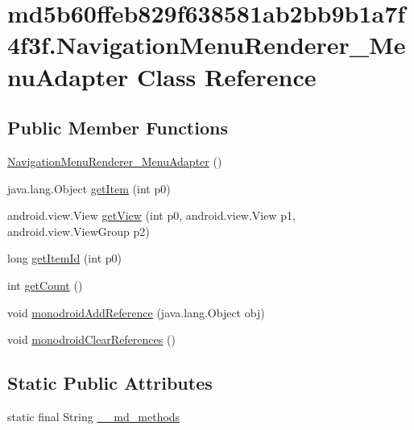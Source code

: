 \hypertarget{classmd5b60ffeb829f638581ab2bb9b1a7f4f3f_1_1_navigation_menu_renderer___menu_adapter}{
\section{md5b60ffeb829f638581ab2bb9b1a7f4f3f.NavigationMenuRenderer\_\-MenuAdapter Class Reference}
\label{classmd5b60ffeb829f638581ab2bb9b1a7f4f3f_1_1_navigation_menu_renderer___menu_adapter}
}
\subsection*{Public Member Functions}
\begin{CompactItemize}
\item 
\hyperlink{classmd5b60ffeb829f638581ab2bb9b1a7f4f3f_1_1_navigation_menu_renderer___menu_adapter_b67bcd1f5861431b9aa745c2ad17fcac}{NavigationMenuRenderer\_\-MenuAdapter} ()
\item 
java.lang.Object \hyperlink{classmd5b60ffeb829f638581ab2bb9b1a7f4f3f_1_1_navigation_menu_renderer___menu_adapter_3cb8fab254be843c50be7d6e6e705d1c}{getItem} (int p0)
\item 
android.view.View \hyperlink{classmd5b60ffeb829f638581ab2bb9b1a7f4f3f_1_1_navigation_menu_renderer___menu_adapter_a621b4dceee4ef8f0c60b60b62206b5a}{getView} (int p0, android.view.View p1, android.view.ViewGroup p2)
\item 
long \hyperlink{classmd5b60ffeb829f638581ab2bb9b1a7f4f3f_1_1_navigation_menu_renderer___menu_adapter_97604532182d2b563da571e93f4470d2}{getItemId} (int p0)
\item 
int \hyperlink{classmd5b60ffeb829f638581ab2bb9b1a7f4f3f_1_1_navigation_menu_renderer___menu_adapter_8d535563c8612033ca9ed9f3f7c61aae}{getCount} ()
\item 
void \hyperlink{classmd5b60ffeb829f638581ab2bb9b1a7f4f3f_1_1_navigation_menu_renderer___menu_adapter_9bf9b83d132d02411f1545779c1151c0}{monodroidAddReference} (java.lang.Object obj)
\item 
void \hyperlink{classmd5b60ffeb829f638581ab2bb9b1a7f4f3f_1_1_navigation_menu_renderer___menu_adapter_94f3e1fc8dc319bcb897648b1c681949}{monodroidClearReferences} ()
\end{CompactItemize}
\subsection*{Static Public Attributes}
\begin{CompactItemize}
\item 
static final String \hyperlink{classmd5b60ffeb829f638581ab2bb9b1a7f4f3f_1_1_navigation_menu_renderer___menu_adapter_09a523e0422c5d80d38ab17bbf6fe89b}{\_\-\_\-md\_\-methods}
\end{CompactItemize}
